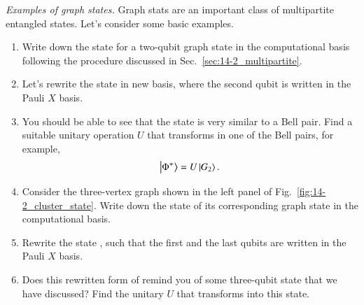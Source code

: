 \begin{exercise}
\emph{Examples of graph states.} Graph stats are an important class of multipartite entangled states. Let's consider some basic examples.
\begin{enumerate}[label=(\alph*)]
    \item Write down the state for a two-qubit graph state  in the computational basis following the procedure discussed in Sec.~\ref{sec:14-2_multipartite}.
    \item Let's rewrite the state  in new basis, where the second qubit is written in the Pauli $X$ basis.
    \item You should be able to see that the state  is very similar to a Bell pair. Find a suitable unitary operation $U$ that transforms  in one of the Bell pairs, for example,
    \begin{equation}
        \left| \Phi^+ \right\rangle = U \left| G_2 \right\rangle.
    \end{equation}
    \item Consider the three-vertex graph shown in the left panel of Fig.~\ref{fig:14-2_cluster_state}. Write down the state of its corresponding graph state  in the computational basis.
    \item Rewrite the state , such that the first and the last qubits are written in the Pauli $X$ basis.
    \item Does this rewritten form of  remind you of some three-qubit state that we have discussed? Find the unitary $U$ that transforms  into this state.
\end{enumerate}
\end{exercise}
